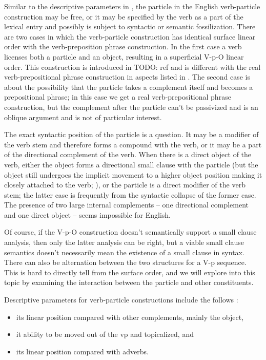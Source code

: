 \documentclass[UTF8, a4paper, oneside, scheme=plain, 12pt]{ctexbook}
\newcommand*{\citesec}[1]{\S~{#1}}
\newcommand*{\citechap}[1]{Ch.~{#1}}
\begin{document}
Similar to the descriptive parameters in ,
the particle in the English verb-particle construction may be free, 
or it may be specified by the verb as a part of the lexical entry
and possibly is subject to syntactic or semantic fossilization. 
There are two cases in which the verb-particle construction 
has identical surface linear order 
with the verb-preposition phrase construction.
In the first case a verb licenses both a particle and an object,
resulting in a superficial V-p-O linear order. 
This construction is introduced in TODO: ref
and is different with the real verb-prepositional phrase construction
in aspects listed in \citet[\citechap{4}, \citesec{6.2}]{cgel}.
The second case is about the possibility that the particle takes a complement itself 
and becomes a prepositional phrase;
in this case we get a real verb-prepositional phrase construction,
but the complement after the particle can't be passivized
and is an oblique argument and is not of particular interest.

The exact syntactic position of the particle is a question.
It may be a modifier of the verb stem and therefore forms a compound with the verb, 
or it may be a part of the directional complement of the verb.
When there is a direct object of the verb, 
either the object forms a directional small clause with the particle
(but the object still undergoes the implicit movement to a higher object position 
making it closely attached to the verb; ), 
or the particle is a direct modifier of the verb stem; 
the latter case is frequently from the syntactic collapse of the former case.
The presence of two large internal complements -- 
one directional complement and one direct object -- seems impossible for English.

Of course, if the V-p-O construction doesn't semantically support a small clause analysis, 
then only the latter analysis can be right, 
but a viable small clause semantics doesn't necessarily mean the existence of a small clause in syntax.
There can also be alternation between the two structures for a V-p sequence.
This is hard to directly tell from the surface order, 
and we will explore into this topic by examining the interaction between the particle and other constituents. 


Descriptive parameters for verb-particle constructions 
include the follows \citep[\citechap{4}, \citesec{6.3}]{cgel}:
\begin{itemize}
    \item its linear position compared with other complements, mainly the object, 
    \item it ability to be moved out of the \acs{vp}
        and topicalized, and 
    \item its linear position compared with adverbs.
\end{itemize}
\end{document}
